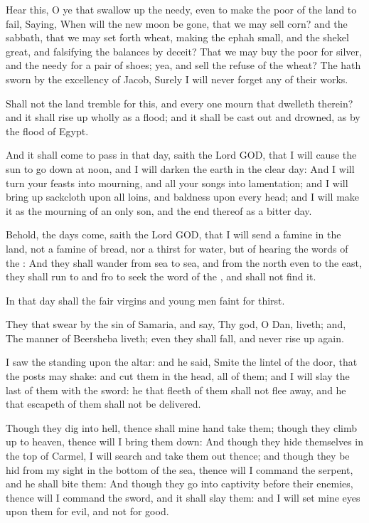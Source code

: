 \Verse Hear this, O ye that swallow up the needy, even to make the poor of the land to fail, \Verse Saying, When will the new moon be gone, that we may sell corn? and the sabbath, that we may set forth wheat, making the ephah small, and the shekel great, and falsifying the balances by deceit?  \Verse That we may buy the poor for silver, and the needy for a pair of shoes; yea, and sell the refuse of the wheat?  \Verse The \LORD hath sworn by the excellency of Jacob, Surely I will never forget any of their works.

\Verse Shall not the land tremble for this, and every one mourn that dwelleth therein? and it shall rise up wholly as a flood; and it shall be cast out and drowned, as by the flood of Egypt.

\Verse And it shall come to pass in that day, saith the Lord GOD, that I will cause the sun to go down at noon, and I will darken the earth in the clear day: \Verse And I will turn your feasts into mourning, and all your songs into lamentation; and I will bring up sackcloth upon all loins, and baldness upon every head; and I will make it as the mourning of an only son, and the end thereof as a bitter day.

\Verse Behold, the days come, saith the Lord GOD, that I will send a famine in the land, not a famine of bread, nor a thirst for water, but of hearing the words of the \LORD: \Verse And they shall wander from sea to sea, and from the north even to the east, they shall run to and fro to seek the word of the \LORD, and shall not find it.

\Verse In that day shall the fair virgins and young men faint for thirst.

\Verse They that swear by the sin of Samaria, and say, Thy god, O Dan, liveth; and, The manner of Beersheba liveth; even they shall fall, and never rise up again.


\Chapter
\Verse I saw the \LORD standing upon the altar: and he said, Smite the lintel of the door, that the posts may shake: and cut them in the head, all of them; and I will slay the last of them with the sword: he that fleeth of them shall not flee away, and he that escapeth of them shall not be delivered.

\Verse Though they dig into hell, thence shall mine hand take them; though they climb up to heaven, thence will I bring them down: \Verse And though they hide themselves in the top of Carmel, I will search and take them out thence; and though they be hid from my sight in the bottom of the sea, thence will I command the serpent, and he shall bite them: \Verse And though they go into captivity before their enemies, thence will I command the sword, and it shall slay them: and I will set mine eyes upon them for evil, and not for good.

